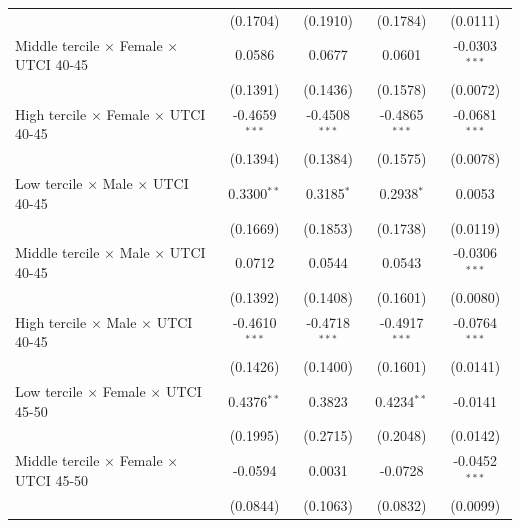 \begin{table}[htbp]
\begin{tabular}{lcccc}
                                                           & (0.1704)        & (0.1910)            & (0.1784)          & (0.0111)\\   
      Middle tercile $\times$ Female $\times$ UTCI 40-45   & 0.0586          & 0.0677              & 0.0601            & -0.0303$^{***}$\\   
                                                           & (0.1391)        & (0.1436)            & (0.1578)          & (0.0072)\\   
      High tercile $\times$ Female $\times$ UTCI 40-45     & -0.4659$^{***}$ & -0.4508$^{***}$     & -0.4865$^{***}$   & -0.0681$^{***}$\\   
                                                           & (0.1394)        & (0.1384)            & (0.1575)          & (0.0078)\\   
      Low tercile $\times$ Male $\times$ UTCI 40-45        & 0.3300$^{**}$   & 0.3185$^{*}$        & 0.2938$^{*}$      & 0.0053\\   
                                                           & (0.1669)        & (0.1853)            & (0.1738)          & (0.0119)\\   
      Middle tercile $\times$ Male $\times$ UTCI 40-45     & 0.0712          & 0.0544              & 0.0543            & -0.0306$^{***}$\\   
                                                           & (0.1392)        & (0.1408)            & (0.1601)          & (0.0080)\\   
      High tercile $\times$ Male $\times$ UTCI 40-45       & -0.4610$^{***}$ & -0.4718$^{***}$     & -0.4917$^{***}$   & -0.0764$^{***}$\\   
                                                           & (0.1426)        & (0.1400)            & (0.1601)          & (0.0141)\\   
      Low tercile $\times$ Female $\times$ UTCI 45-50      & 0.4376$^{**}$   & 0.3823              & 0.4234$^{**}$     & -0.0141\\   
                                                           & (0.1995)        & (0.2715)            & (0.2048)          & (0.0142)\\   
      Middle tercile $\times$ Female $\times$ UTCI 45-50   & -0.0594         & 0.0031              & -0.0728           & -0.0452$^{***}$\\   
                                                           & (0.0844)        & (0.1063)            & (0.0832)          & (0.0099)\\   

\end{tabular}
\end{table}
